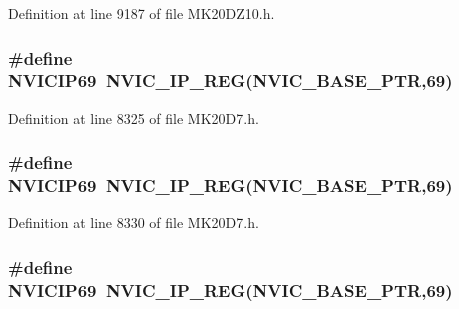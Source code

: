 Definition at line 9187 of file M\+K20\+D\+Z10.\+h.

\subsubsection[{\texorpdfstring{N\+V\+I\+C\+I\+P69}{NVICIP69}}]{\setlength{\rightskip}{0pt plus 5cm}\#define N\+V\+I\+C\+I\+P69~{\bf N\+V\+I\+C\+\_\+\+I\+P\+\_\+\+R\+EG}({\bf N\+V\+I\+C\+\_\+\+B\+A\+S\+E\+\_\+\+P\+TR},69)}\hypertarget{group___n_v_i_c___register___accessor___macros_gaaba44052dd67a8d958cea38f0d7a2296}{}\label{group___n_v_i_c___register___accessor___macros_gaaba44052dd67a8d958cea38f0d7a2296}


Definition at line 8325 of file M\+K20\+D7.\+h.

\subsubsection[{\texorpdfstring{N\+V\+I\+C\+I\+P69}{NVICIP69}}]{\setlength{\rightskip}{0pt plus 5cm}\#define N\+V\+I\+C\+I\+P69~{\bf N\+V\+I\+C\+\_\+\+I\+P\+\_\+\+R\+EG}({\bf N\+V\+I\+C\+\_\+\+B\+A\+S\+E\+\_\+\+P\+TR},69)}\hypertarget{group___n_v_i_c___register___accessor___macros_gaaba44052dd67a8d958cea38f0d7a2296}{}\label{group___n_v_i_c___register___accessor___macros_gaaba44052dd67a8d958cea38f0d7a2296}


Definition at line 8330 of file M\+K20\+D7.\+h.

\subsubsection[{\texorpdfstring{N\+V\+I\+C\+I\+P69}{NVICIP69}}]{\setlength{\rightskip}{0pt plus 5cm}\#define N\+V\+I\+C\+I\+P69~{\bf N\+V\+I\+C\+\_\+\+I\+P\+\_\+\+R\+EG}({\bf N\+V\+I\+C\+\_\+\+B\+A\+S\+E\+\_\+\+P\+TR},69)}\hypertarget{group___n_v_i_c___register___accessor___macros_gaaba44052dd67a8d958cea38f0d7a2296}{}\label{group___n_v_i_c___register___accessor___macros_gaaba44052dd67a8d958cea38f0d7a2296}


